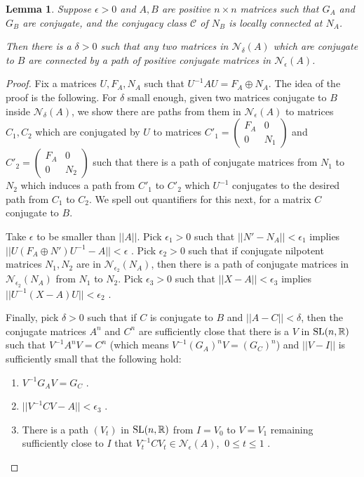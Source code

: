 \documentclass{amsart}
\newtheorem{lemma}[theorem]{Lemma}
\theoremstyle{definition}
\theoremstyle{remark}
\numberwithin{equation}{section}
\begin{document}
{{\begin{lemma} \label{reduction} Suppose $\epsilon >0$ and $A,B$ are positive 
$n\times n$ matrices such that $G_A$ and $G_B$ are conjugate,  
and the conjugacy class $\mathcal C$ of 
$N_B$ is locally connected at $N_A$. 

Then there is a $\delta >0$ such that any two 
matrices in $\mathcal N_{\delta}(A)$ which are conjugate to 
$B$ are connected by a 
path of positive conjugate matrices 
in $\mathcal N_{\epsilon}(A)$. 
\end{lemma} 

\begin{proof} 
Fix a matrices $U,F_A,N_A$ such that $U^{-1}AU=F_A \oplus N_A$. 
The idea of the proof is the following. 
For $\delta $ small enough, 
given two matrices conjugate to $B$ inside 
$\mathcal N_{\delta}(A)$, we show there are paths from them in 
  $\mathcal N_{\epsilon}(A)$ to matrices
$C_1,C_2$  which are 
conjugated by $U$ to matrices 
$C'_1=\left(
\begin{smallmatrix} F_A & 0 \\ 0 & N_1 
\end{smallmatrix}
\right) $ 
and 
$C'_2=\left(
\begin{smallmatrix} F_A & 0 \\ 0 & N_2 
\end{smallmatrix}
\right) $ 
such that there is a path of conjugate 
matrices from $N_1$ to $N_2$ which induces 
a path from $C'_1$ to $C'_2$ which 
$U^{-1}$ conjugates to the desired path 
from $C_1$ to $C_2$. We spell out quantifiers for this next, 
for a matrix $C$ conjugate to $B$.  

Take $\epsilon $ to be smaller than $||A||$. 
Pick $\epsilon_1>0$ such that 
$||N'-N_A||<\epsilon_1$ implies $||U(F_A\oplus N')U^{-1}-A||< \epsilon$ . 
Pick $\epsilon_2>0$ such that if conjugate nilpotent matrices 
$N_1,N_2$ are in $\mathcal N_{\epsilon_2}(N_A)$, then there is a path 
of conjugate matrices in $\mathcal N_{\epsilon_2}(N_A)$ from 
$N_1$ to $N_2$. Pick $\epsilon_3>0$ such that  
$||X-A||<\epsilon_3$ implies $||U^{-1}(X-A)U||<\epsilon_2$ .  

Finally, pick $\delta >0$ such that if $C$ is conjugate to 
$B$ and  $||A-C||<\delta$, then the conjugate matrices 
$A^n$ and $C^n$ are sufficiently close that there is a 
$V$ in $\textnormal{SL}(n,\mathbb R)$ such that $V^{-1}A^nV=
C^n$ (which means 
$V^{-1}(G_A)^nV=
(G_C)^n$)  and $||V-I||$ is sufficiently small that the following 
hold: 
\begin{enumerate} 
\item 
$V^{-1}G_AV=G_C$ . 
\item 
$||V^{-1}CV-A||<\epsilon_3$ . 
\item 
There is a path $(V_t)$ in 
$\textnormal{SL}(n,\mathbb R)$ from $I=V_0$ to
$V=V_1$ remaining sufficiently close 
to $I$ that 
$V_t^{-1}CV_t\in \mathcal N_{\epsilon}(A)$, $\ 0\leq t\leq 1$ . 
\end{enumerate} 


\end{proof}}}
\end{document}

